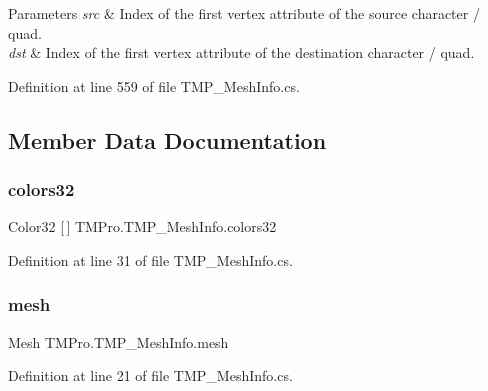 \begin{DoxyParams}{Parameters}
{\em src} & Index of the first vertex attribute of the source character / quad.\\
\hline
{\em dst} & Index of the first vertex attribute of the destination character / quad.\\
\hline
\end{DoxyParams}


Definition at line 559 of file T\+M\+P\+\_\+\+Mesh\+Info.\+cs.



\subsection{Member Data Documentation}
\mbox{\label{struct_t_m_pro_1_1_t_m_p___mesh_info_afcf1ebf60c4633e1b14cb1855347d836}} 
\subsubsection{\texorpdfstring{colors32}{colors32}}
{\footnotesize\ttfamily Color32 \mbox{[}$\,$\mbox{]} T\+M\+Pro.\+T\+M\+P\+\_\+\+Mesh\+Info.\+colors32}



Definition at line 31 of file T\+M\+P\+\_\+\+Mesh\+Info.\+cs.

\mbox{\label{struct_t_m_pro_1_1_t_m_p___mesh_info_a2b53d43187ab86ccefe3f5dd6babcfef}} 
\subsubsection{\texorpdfstring{mesh}{mesh}}
{\footnotesize\ttfamily Mesh T\+M\+Pro.\+T\+M\+P\+\_\+\+Mesh\+Info.\+mesh}



Definition at line 21 of file T\+M\+P\+\_\+\+Mesh\+Info.\+cs.

\mbox{\label{struct_t_m_pro_1_1_t_m_p___mesh_info_aefcdce93dcac35b872ddfff6200fa856}} 

